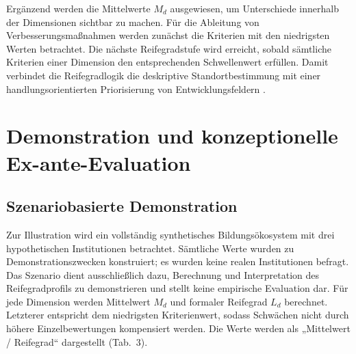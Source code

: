 \documentclass[10pt,a4paper]{article}
\begin{document}
Ergänzend werden die Mittelwerte $M_d$ ausgewiesen, um Unterschiede innerhalb der Dimensionen sichtbar zu machen. Für die Ableitung von Verbesserungsmaßnahmen werden zunächst die Kriterien mit den niedrigsten Werten betrachtet. Die nächste Reifegradstufe wird erreicht, sobald sämtliche Kriterien einer Dimension den entsprechenden Schwellenwert erfüllen. Damit verbindet die Reifegradlogik die deskriptive Standortbestimmung mit einer handlungsorientierten Priorisierung von Entwicklungsfeldern \cite{PR11}.

\section{Demonstration und konzeptionelle Ex-ante-Evaluation}

\subsection{Szenariobasierte Demonstration}

Zur Illustration wird ein vollständig synthetisches Bildungsökosystem mit drei hypothetischen Institutionen betrachtet. Sämtliche Werte wurden zu Demonstrationszwecken konstruiert; es wurden keine realen Institutionen befragt. Das Szenario dient ausschließlich dazu, Berechnung und Interpretation des Reifegradprofils zu demonstrieren und stellt keine empirische Evaluation dar. Für jede Dimension werden Mittelwert $M_d$ und formaler Reifegrad $L_d$ berechnet. Letzterer entspricht dem niedrigsten Kriterienwert, sodass Schwächen nicht durch höhere Einzelbewertungen kompensiert werden. Die Werte werden als „Mittelwert / Reifegrad“ dargestellt (Tab.~3).
\end{document}

